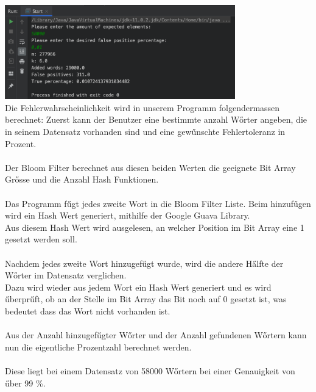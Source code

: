 \documentclass[11pt, a4paper]{article}
\begin{document}
\includegraphics[width=10cm]{image/Result.png}\\
Die Fehlerwahrscheinlichkeit wird in unserem Programm folgendermassen berechnet:
Zuerst kann der Benutzer eine bestimmte anzahl W{\H o}rter angeben, die in seinem Datensatz vorhanden sind und eine gew{\H u}nschte Fehlertoleranz in Prozent.\\
\\
Der Bloom Filter berechnet aus diesen beiden Werten die geeignete Bit Array Gr{\H o}sse und die Anzahl Hash Funktionen.\\
\\
Das Programm f{\H u}gt jedes zweite Wort in die Bloom Filter Liste. Beim hinzuf{\H u}gen wird ein Hash Wert generiert, mithilfe der Google Guava Library.\\
Aus diesem Hash Wert wird ausgelesen, an welcher Position im Bit Array eine 1 gesetzt werden soll.\\
\\
Nachdem jedes zweite Wort hinzugef{\H u}gt wurde, wird die andere H{\H a}lfte der W{\H o}rter im Datensatz verglichen.\\
Dazu wird wieder aus jedem Wort ein Hash Wert generiert und es wird {\H u}berpr{\H u}ft, ob an der Stelle im Bit Array das Bit noch auf 0 gesetzt ist, was bedeutet dass das Wort nicht vorhanden ist.\\
\\
Aus der Anzahl hinzugef{\H u}gter W{\H o}rter und der Anzahl gefundenen W{\H o}rtern kann nun die eigentliche Prozentzahl berechnet werden.\\
\\
Diese liegt bei einem Datensatz von 58000 W{\H o}rtern bei einer Genauigkeit von {\H u}ber 99 \%.
\end{document}
